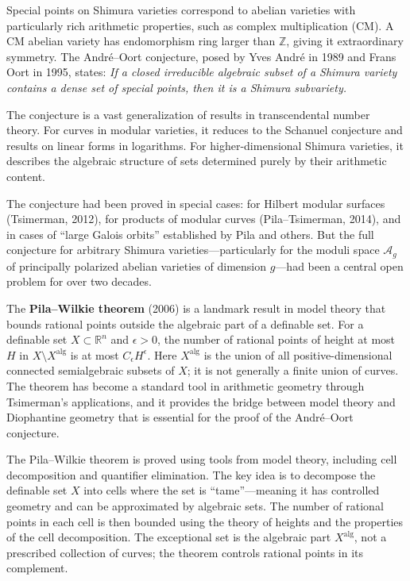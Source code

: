 Special points on Shimura varieties correspond to abelian varieties with particularly rich arithmetic properties, such as complex multiplication (CM). A CM abelian variety has endomorphism ring larger than $\mathbb{Z}$, giving it extraordinary symmetry. The Andr\'{e}--Oort conjecture, posed by Yves Andr\'{e} in 1989 and Frans Oort in 1995, states: \emph{If a closed irreducible algebraic subset of a Shimura variety contains a dense set of special points, then it is a Shimura subvariety.}

The conjecture is a vast generalization of results in transcendental number theory. For curves in modular varieties, it reduces to the Schanuel conjecture and results on linear forms in logarithms. For higher-dimensional Shimura varieties, it describes the algebraic structure of sets determined purely by their arithmetic content.

The conjecture had been proved in special cases: for Hilbert modular surfaces (Tsimerman, 2012), for products of modular curves (Pila--Tsimerman, 2014), and in cases of ``large Galois orbits'' established by Pila and others. But the full conjecture for arbitrary Shimura varieties---particularly for the moduli space $\mathcal{A}_g$ of principally polarized abelian varieties of dimension $g$---had been a central open problem for over two decades.

The \textbf{Pila--Wilkie theorem} (2006) is a landmark result in model theory that bounds rational points outside the algebraic part of a definable set. For a definable set $X \subset \mathbb{R}^n$ and $\epsilon > 0$, the number of rational points of height at most $H$ in $X \setminus X^{\mathrm{alg}}$ is at most $C_\epsilon H^\epsilon$. Here $X^{\mathrm{alg}}$ is the union of all positive-dimensional connected semialgebraic subsets of $X$; it is not generally a finite union of curves. The theorem has become a standard tool in arithmetic geometry through Tsimerman's applications, and it provides the bridge between model theory and Diophantine geometry that is essential for the proof of the Andr\'{e}--Oort conjecture.

The Pila--Wilkie theorem is proved using tools from model theory, including cell decomposition and quantifier elimination. The key idea is to decompose the definable set $X$ into cells where the set is ``tame''---meaning it has controlled geometry and can be approximated by algebraic sets. The number of rational points in each cell is then bounded using the theory of heights and the properties of the cell decomposition. The exceptional set is the algebraic part $X^{\mathrm{alg}}$, not a prescribed collection of curves; the theorem controls rational points in its complement.

